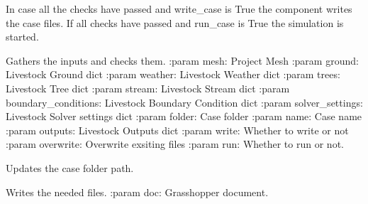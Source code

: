 \documentclass[letterpaper,10pt,english]{sphinxmanual}
\begin{document}
\begin{fulllineitems}
\begin{fulllineitems}
\label{\detokenize{cmf:livestock.components.comp_cmf.CMFSolve.run}}
In case all the checks have passed and write\_case is True the component writes the case files.
If all checks have passed and run\_case is True the simulation is started.

\end{fulllineitems}


\begin{fulllineitems}
\label{\detokenize{cmf:livestock.components.comp_cmf.CMFSolve.run_checks}}
Gathers the inputs and checks them.
:param mesh: Project Mesh
:param ground: Livestock Ground dict
:param weather: Livestock Weather dict
:param trees: Livestock Tree dict
:param stream: Livestock Stream dict
:param boundary\_conditions: Livestock Boundary Condition dict
:param solver\_settings: Livestock Solver settings dict
:param folder: Case folder
:param name: Case name
:param outputs: Livestock Outputs dict
:param write: Whether to write or not
:param overwrite: Overwrite exsiting files
:param run: Whether to run or not.

\end{fulllineitems}


\begin{fulllineitems}
\label{\detokenize{cmf:livestock.components.comp_cmf.CMFSolve.update_case_path}}
Updates the case folder path.

\end{fulllineitems}


\begin{fulllineitems}
\label{\detokenize{cmf:livestock.components.comp_cmf.CMFSolve.write}}
Writes the needed files.
:param doc: Grasshopper document.

\end{fulllineitems}


\end{fulllineitems}
\end{document}
